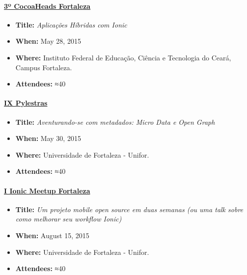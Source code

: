 \documentclass[]{article}
\providecommand{\tightlist}{%
  \setlength{\itemsep}{0pt}\setlength{\parskip}{0pt}}
\let\oldparagraph\paragraph
\renewcommand{\paragraph}[1]{\oldparagraph{#1}\mbox{}}
\begin{document}
\paragraph{\texorpdfstring{\href{http://www.cocoaheads.com.br/agendas/detalhes/79/}{3º
CocoaHeads
Fortaleza}}{3º CocoaHeads Fortaleza}}\label{uxba-cocoaheads-fortaleza}

\begin{itemize}
\tightlist
\item
  \textbf{Title:} \emph{Aplicações Híbridas com Ionic}
\item
  \textbf{When:} May 28, 2015
\item
  \textbf{Where:} Instituto Federal de Educação, Ciência e Tecnologia do
  Ceará, Campus Fortaleza.
\item
  \textbf{Attendees:} ≈40
\end{itemize}

\paragraph{\texorpdfstring{\href{http://pylestras.org/evento/ix-pylestras/}{IX
Pylestras}}{IX Pylestras}}\label{ix-pylestras}

\begin{itemize}
\tightlist
\item
  \textbf{Title:} \emph{Aventurando-se com metadados: Micro Data e Open
  Graph}
\item
  \textbf{When:} May 30, 2015
\item
  \textbf{Where:} Universidade de Fortaleza - Unifor.
\item
  \textbf{Attendees:} ≈40
\end{itemize}

\paragraph{\texorpdfstring{\href{http://www.meetup.com/pt/Ionic-Ceara/events/224620543/}{I
Ionic Meetup
Fortaleza}}{I Ionic Meetup Fortaleza}}\label{i-ionic-meetup-fortaleza}

\begin{itemize}
\tightlist
\item
  \textbf{Title:} \emph{Um projeto mobile open source em duas semanas
  (ou uma talk sobre como melhorar seu workflow Ionic)}
\item
  \textbf{When:} August 15, 2015
\item
  \textbf{Where:} Universidade de Fortaleza - Unifor.
\item
  \textbf{Attendees:} ≈40
\end{itemize}
\end{document}
